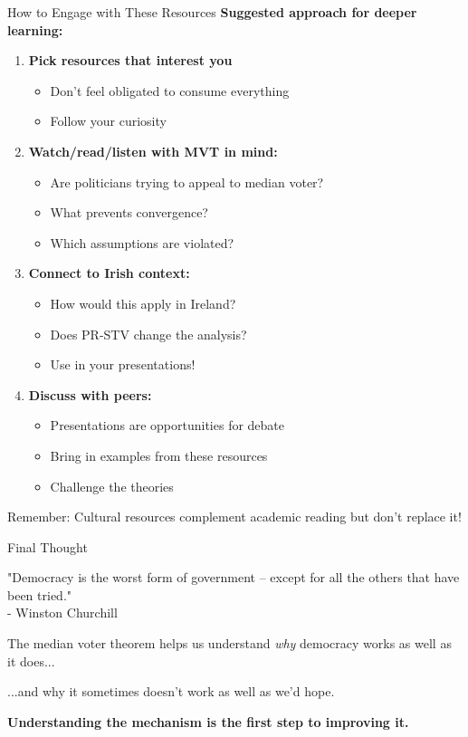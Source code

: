 \documentclass[10pt]{beamer}
\begin{document}
\begin{frame}[allowframebreaks]{How to Engage with These Resources}
\textbf{Suggested approach for deeper learning:}

\begin{enumerate}
\item \textbf{Pick resources that interest you}
\begin{itemize}
\item Don't feel obligated to consume everything
\item Follow your curiosity
\end{itemize}

\item \textbf{Watch/read/listen with MVT in mind:}
\begin{itemize}
\item Are politicians trying to appeal to median voter?
\item What prevents convergence?
\item Which assumptions are violated?
\end{itemize}
 \framebreak   
\item \textbf{Connect to Irish context:}
\begin{itemize}
\item How would this apply in Ireland?
\item Does PR-STV change the analysis?
\item Use in your presentations!
\end{itemize}

\item \textbf{Discuss with peers:}
\begin{itemize}
\item Presentations are opportunities for debate
\item Bring in examples from these resources
\item Challenge the theories
\end{itemize}
\end{enumerate}


\alert{Remember:} Cultural resources complement academic reading but don't replace it!
\end{frame}

\begin{frame}{Final Thought}
\begin{center}
\large "Democracy is the worst form of government – except for all the others that have been tried." \\

- Winston Churchill
\end{center}



\begin{center}
The median voter theorem helps us understand \textit{why} democracy works as well as it does...


...and why it sometimes doesn't work as well as we'd hope.


\textbf{Understanding the mechanism is the first step to improving it.}
\end{center}
\end{frame}
\end{document}
